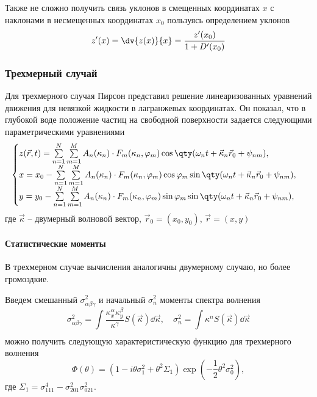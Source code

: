 Также не сложно получить связь уклонов в смещенных координатах $x$ с наклонами
в несмещенных координатах $x_0$ пользуясь определением уклонов
 \begin{equation}
    z'(x) = \dv{z(x)}{x} = \frac{z'(x_0)}{1 + D'(x_0)}
\end{equation}



\subsubsection{Трехмерный случай}%

Для трехмерного случая Пирсон \cite{pierson} представил решение
линеаризованных уравнений движения для невязкой жидкости в лагранжевых
координатах. Он показал, что в глубокой воде положение частиц на свободной поверхности задается следующими параметрическими уравнениями
\begin{equation}
    \begin{cases}
        \label{eq:surface2dcwm}
        z(\vec r,t) = \sum\limits_{n=1}^{N} \sum\limits_{m=1}^{M}
        A_n(\kappa_n) \cdot
        F_m(\kappa_n,\phi_m) \cos \qty(\omega_n t + \vec \kappa_n \vec r_0 +
        \psi_{nm}),    \\
        x = x_0 - \sum\limits_{n=1}^{N} \sum\limits_{m=1}^{M}
        A_n(\kappa_n) \cdot
        F_m(\kappa_n,\phi_m) \cos\phi_m \sin\qty(\omega_n t + \vec \kappa_n \vec r_0 +
        \psi_{nm}),\\
        y = y_{0} - \sum\limits_{n=1}^{N} \sum\limits_{m=1}^{M}
        A_n(\kappa_n) \cdot
        F_m(\kappa_n,\phi_m) \sin \phi_m \sin \qty(\omega_n t + \vec \kappa_n \vec
        r_0 + \psi_{nm}),
    \end{cases}
\end{equation}
где $\vec \kappa$ -- двумерный волновой вектор,  
$\vec r_0 = (x_0, y_0)$, $\vec r = (x, y)$


\paragraph{Статистические моменты}
\label{par:statisticheskie_momenty}
В трехмерном случае вычисления аналогичны двумерному случаю, но более
громоздкие.  

Введем смешанный $\sigma_{\alpha \beta \gamma}^2$ и начальный $\sigma_n^2$ моменты спектра волнения
\begin{equation}
    \sigma^2_{\alpha \beta \gamma} =  \int\limits_{} \frac{\kappa_x^\alpha
    \kappa_y^\beta}{\kappa^{\gamma}} S(\vec \kappa) \dd \vec \kappa,\quad
    \sigma_n^2 = \int\limits_{}^{} \kappa^n S(\vec \kappa) \dd \vec \kappa 
\end{equation}
можно получить следующую характеристическую функцию для трехмерного волнения
\begin{equation}
    \label{eq:char}
    \Phi(\theta) = (1 - i \theta \sigma_1^2 + \theta^2 \Sigma_1)
    \exp(-\frac{1}{2} \theta^2 \sigma_0^2),
\end{equation}
где $\Sigma_1 = \sigma^4_{111} - \sigma_{201}^2 \sigma_{021}^2$.

